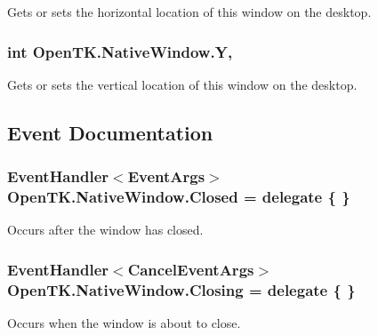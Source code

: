 Gets or sets the horizontal location of this window on the desktop. 

\hypertarget{class_open_t_k_1_1_native_window_a6652ffe8f86f05bddd470872874aa8b8}{
\subsubsection[{Y}]{\setlength{\rightskip}{0pt plus 5cm}int Open\-T\-K.\-Native\-Window.\-Y\hspace{0.3cm}{\ttfamily [get]}, {\ttfamily [set]}}}\label{class_open_t_k_1_1_native_window_a6652ffe8f86f05bddd470872874aa8b8}


Gets or sets the vertical location of this window on the desktop. 



\subsection{Event Documentation}
\hypertarget{class_open_t_k_1_1_native_window_a8eb75858475f8cb49540c8142c4796f9}{
\subsubsection[{Closed}]{\setlength{\rightskip}{0pt plus 5cm}Event\-Handler$<$Event\-Args$>$ Open\-T\-K.\-Native\-Window.\-Closed = delegate \{ \}}}\label{class_open_t_k_1_1_native_window_a8eb75858475f8cb49540c8142c4796f9}


Occurs after the window has closed. 

\hypertarget{class_open_t_k_1_1_native_window_ac6c8dbb48a823371397548b7c55e5459}{
\subsubsection[{Closing}]{\setlength{\rightskip}{0pt plus 5cm}Event\-Handler$<$Cancel\-Event\-Args$>$ Open\-T\-K.\-Native\-Window.\-Closing = delegate \{ \}}}\label{class_open_t_k_1_1_native_window_ac6c8dbb48a823371397548b7c55e5459}


Occurs when the window is about to close. 

